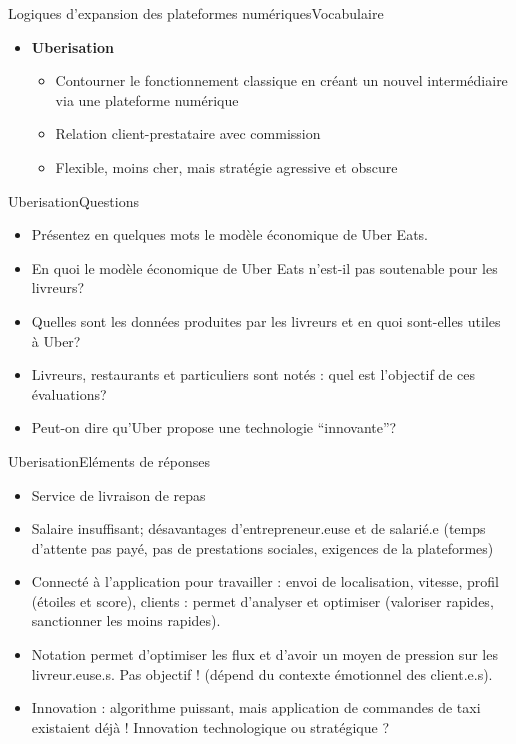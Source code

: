 \documentclass{beamer}
\begin{document}
\begin{frame}{Logiques d'expansion des plateformes numériques}{Vocabulaire}
	\begin{itemize}
		\item \textbf{Uberisation}
		      \begin{itemize}
			      \item Contourner le fonctionnement classique en créant un nouvel intermédiaire via une plateforme numérique
			      \item Relation client-prestataire avec commission
			      \item Flexible, moins cher, mais stratégie agressive et obscure
		      \end{itemize}
	\end{itemize}

	\href{https://www.youtube.com/watch?v=ST_KVB6bEdw}{}
\end{frame}

\begin{frame}{Uberisation}{Questions}
	\begin{itemize}
		\item Présentez en quelques mots le modèle économique de Uber Eats.
		\item En quoi le modèle économique de Uber Eats n’est-il pas soutenable pour les livreurs?
		\item Quelles sont les données produites par les livreurs et en quoi sont-elles utiles à Uber?
		\item Livreurs, restaurants et particuliers sont notés : quel est l’objectif de ces évaluations?
		\item Peut-on dire qu’Uber propose une technologie ``innovante''?
	\end{itemize}
\end{frame}


\begin{frame}{Uberisation}{Eléments de réponses}
	\begin{itemize}
		\item<1-> Service de livraison de repas
		\item<2-> Salaire insuffisant; désavantages d'entrepreneur.euse et de salarié.e (temps d'attente pas payé, pas de prestations sociales, exigences de la plateformes)
		\item<3-> Connecté à l'application pour travailler : envoi de localisation, vitesse, profil (étoiles et score), clients : permet d'analyser et optimiser (valoriser rapides, sanctionner les moins rapides).
		\item<4-> Notation permet d'optimiser les flux et d'avoir un moyen de pression sur les livreur.euse.s. Pas objectif ! (dépend du contexte émotionnel des client.e.s).
		\item<5-> Innovation : algorithme puissant, mais application de commandes de taxi existaient déjà ! Innovation technologique ou stratégique ?
	\end{itemize}
\end{frame}
\end{document}

